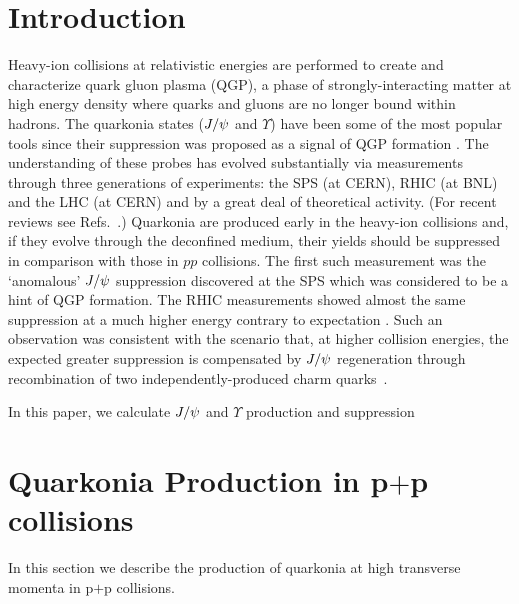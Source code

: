 \documentclass[aps,prc,preprint,superscriptaddress,showpacs,showkeys,amsmath]{revtex4-1}
\begin{document}
\section{Introduction}
Heavy-ion collisions at relativistic energies are performed to create and characterize 
quark gluon plasma (QGP), a phase of strongly-interacting matter at high energy density 
where quarks and gluons are no longer bound within hadrons.
The quarkonia states ($J/\psi$ and $\Upsilon$) have been some of the most popular tools 
since their suppression was proposed as a signal of QGP formation \cite{Matsui:1986dk}.
The understanding of these probes has evolved substantially via measurements 
through three generations of experiments: the SPS (at CERN), RHIC (at BNL) and the LHC (at CERN) 
and by a great deal of theoretical activity. (For recent reviews see 
Refs.~\cite{Schukraft:2013wba,Kluberg:2009wc,Brambilla:2010cs}.)
Quarkonia are produced early in the heavy-ion collisions and, if they evolve
through the deconfined medium, their yields should be suppressed in comparison with those in $pp$ collisions. 
The first such measurement was the `anomalous' $J/\psi$ suppression discovered at the SPS 
which was considered to be a hint of QGP formation. The RHIC measurements showed almost the 
same suppression at a much higher energy contrary to expectation \cite{Brambilla:2010cs,Adare:2011yf}. 
Such an observation was consistent with the scenario that, at higher collision energies, the 
expected greater suppression is compensated by  $J/\psi$ regeneration through recombination of two 
independently-produced charm quarks~\cite{Andronic:2003zv}. 

In this paper, we calculate $J/\psi$ and $\Upsilon$ production and
suppression 



\section{Quarkonia Production in p$+$p collisions}
\label{section:ppProduction}
In this section we describe the production of quarkonia at high transverse
momenta in p$+$p collisions. 
\end{document}
